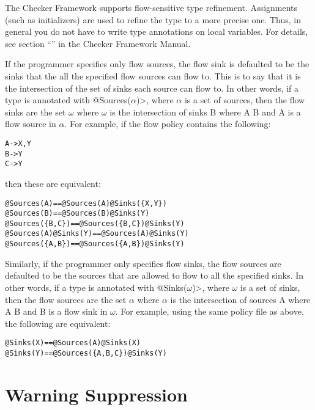 The Checker Framework supports flow-sensitive type refinement.  Assignments (such as
initializers) are used to refine the type to a more precise one.  Thus, in
general you do not have to write type annotations on local variables.  For
details, see section ``'' in the Checker Framework Manual.

If the programmer specifies only flow sources, the flow sink is defaulted
to be the
sinks that the all the specified flow sources can flow to. This is to say that 
it is the intersection of the set of sinks each source can flow to.
 In other words, if a type is annotated with 
\<@Sources($\alpha$)>, where $\alpha$ is a set of sources, then the flow sinks are the set 
$\omega$ where $\omega$ is the intersection of sinks B where A \flowsto{} B and A is a flow source in 
$\alpha$.  For example, if the flow policy contains the following:

\begin{alltt}
  A -> X,Y
  B -> Y
  C -> Y
\end{alltt}
  
\noindent 
then these are equivalent:

\begin{alltt}
  @Sources(A)                 ==   @Sources(A) @Sinks(\{X, Y\})
  @Sources(B)                 ==   @Sources(B) @Sinks(Y)
  @Sources(\{B,C\})             ==   @Sources(\{B,C\}) @Sinks(Y)
  @Sources(A) @Sinks(Y)   ==   @Sources(A) @Sinks(Y) 
  @Sources(\{A,B\})             ==   @Sources(\{A,B\}) @Sinks(Y)
\end{alltt}


Similarly, if the programmer only specifies flow sinks, the flow sources are defaulted to be the sources 
that are allowed to flow to all the specified sinks.  In other words, if a type is annotated with 
\<@Sinks($\omega$)>, where $\omega$ is a set of sinks, then the flow sources are the set 
$\alpha$ where $\alpha$ is the intersection of sources A where A \flowsto{} B and B is a flow sink in 
$\omega$. For example, using the same policy file as above, the following are equivalent:

\begin{alltt}
  @Sinks(X)                   ==   @Sources(A) @Sinks(X)
  @Sinks(Y)                   ==   @Sources(\{A,B,C\}) @Sinks(Y)
\end{alltt}


\section{Warning Suppression\label{sec:waringsuppression}}
 
